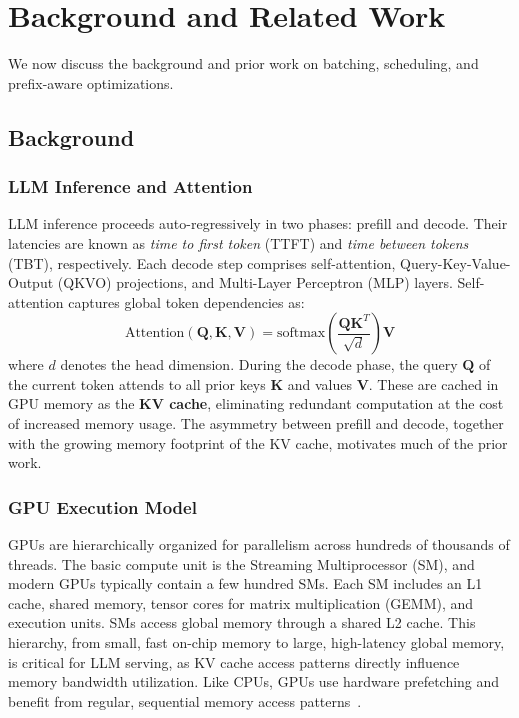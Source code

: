 \section{Background and Related Work}
\label{sec:background}
We now discuss the background and prior work on batching, scheduling, and prefix-aware optimizations.

\subsection{Background}

\subsubsection*{LLM Inference and Attention}
LLM inference proceeds auto-regressively in two phases: prefill and decode. Their latencies are known as \textit{time to first token} (TTFT) and \textit{time between tokens} (TBT), respectively. Each decode step comprises self-attention, Query-Key-Value-Output (QKVO) projections, and Multi-Layer Perceptron (MLP) layers. Self-attention captures global token dependencies as:
\[
\text{Attention}(\mathbf{Q}, \mathbf{K}, \mathbf{V}) = \text{softmax}\left(\frac{\mathbf{Q}\mathbf{K}^T}{\sqrt{d}}\right)\mathbf{V}
\]
where $d$ denotes the head dimension. During the decode phase, the query $\mathbf{Q}$ of the current token attends to all prior keys $\mathbf{K}$ and values $\mathbf{V}$. These are cached in GPU memory as the \textbf{KV cache}, eliminating redundant computation at the cost of increased memory usage. The asymmetry between prefill and decode, together with the growing memory footprint of the KV cache, motivates much of the prior work.

\vspace{-10pt}

\subsubsection*{GPU Execution Model}
GPUs are hierarchically organized for parallelism across hundreds of thousands of threads. The basic compute unit is the Streaming Multiprocessor (SM), and modern GPUs typically contain a few hundred SMs. Each SM includes an L1 cache, shared memory, tensor cores for matrix multiplication (GEMM), and execution units. SMs access global memory through a shared L2 cache. This hierarchy, from small, fast on-chip memory to large, high-latency global memory, is critical for LLM serving, as KV cache access patterns directly influence memory bandwidth utilization. Like CPUs, GPUs use hardware prefetching and benefit from regular, sequential memory access patterns~\cite{Peng_2017}.

